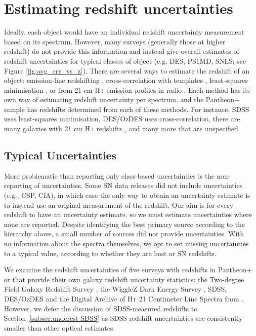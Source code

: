 \documentclass[
  journal=pasa,
  manuscript=research-paper,
  year=2022,
]{cup-journal}
\newcommand{\Hi}{H\,\textsc{i}}
\begin{document}
\section{Estimating redshift uncertainties}\label{sec:uncertainties}

Ideally, each object would have an individual redshift uncertainty measurement based on its spectrum.
However, many surveys (generally those at higher redshift) do not provide this information and instead give overall estimates of redshift uncertainties for typical classes of object (e.g. DES, PS1MD, SNLS; see Figure \ref{fig:avg_err_vs_z}). 
There are several ways to estimate the redshift of an object: emission-line redshifting \citep[e.g.][]{Colless2001}, cross-correlation with templates \citep{Tonry1979}, least-squares minimisation \citep{Bolton2012}, or from 21 cm \Hi\ emission profiles in radio \citep[e.g.][]{Springob2005}.
Each method has its own way of estimating redshift uncertainty per spectrum, and the Pantheon+ sample has redshifts determined from each of these methods.
For instance, SDSS uses least-squares minimisation, DES/OzDES uses cross-correlation, there are many galaxies with 21 cm \Hi\ redshifts \cite[mostly from][]{Springob2005}, and many more that are unspecified.

\subsection{Typical Uncertainties}\label{subsec:typical_unc}
More problematic than reporting only class-based uncertainties is the non-reporting of uncertainties. 
Some SN data releases did not include uncertainties (e.g., CSP, CfA), in which case the only way to obtain an uncertainty estimate is to instead use an original measurement of the redshift.
Our aim is for every redshift to have an uncertainty estimate, so we must estimate uncertainties where none are reported. 
Despite identifying the best primary source according to the hierarchy above, a small number of sources did not provide uncertainties. 
With no information about the spectra themselves, we opt to set missing uncertainties to a typical value, according to whether they are host or SN redshifts.

We examine the redshift uncertainties of five surveys with redshifts in Pantheon+ or that provide their own galaxy redshift uncertainty statistics: the Two-degree Field Galaxy Redshift Survey \citep[2dFGRS;][]{Colless2001}, the WiggleZ Dark Energy Survey \citep{Drinkwater2018}, SDSS, DES/OzDES \citep{Lidman2020} and the Digital Archive of \Hi\ 21 Centimeter Line Spectra from \citet{Springob2005}.
However, we defer the discussion of SDSS-measured redshifts to Section~\ref{subsec:underest-SDSS} as SDSS redshift uncertainties are consistently smaller than other optical estimates.
\end{document}
